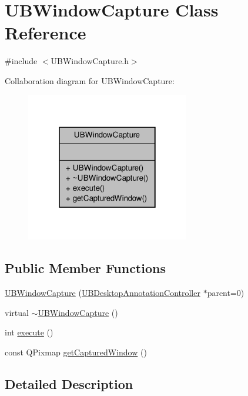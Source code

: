 \hypertarget{class_u_b_window_capture}{\section{U\-B\-Window\-Capture Class Reference}
\label{d6/d53/class_u_b_window_capture}
}


{\ttfamily \#include $<$U\-B\-Window\-Capture.\-h$>$}



Collaboration diagram for U\-B\-Window\-Capture\-:
\nopagebreak
\begin{figure}[H]
\begin{center}
\leavevmode
\includegraphics[width=202pt]{d4/dbd/class_u_b_window_capture__coll__graph}
\end{center}
\end{figure}
\subsection*{Public Member Functions}
\begin{DoxyCompactItemize}
\item 
\hyperlink{class_u_b_window_capture_a0646cd4eff543b445060dcd6746ac2a1}{U\-B\-Window\-Capture} (\hyperlink{class_u_b_desktop_annotation_controller}{U\-B\-Desktop\-Annotation\-Controller} $\ast$parent=0)
\item 
virtual \hyperlink{class_u_b_window_capture_acf5f6ffb1502a4239a331d8d93a998de}{$\sim$\-U\-B\-Window\-Capture} ()
\item 
int \hyperlink{class_u_b_window_capture_af83cdcf66e9caff28220a11f0c761881}{execute} ()
\item 
const Q\-Pixmap \hyperlink{class_u_b_window_capture_ae7ddda0d11b6c3bcd35e0c86d4bce7dd}{get\-Captured\-Window} ()
\end{DoxyCompactItemize}


\subsection{Detailed Description}


